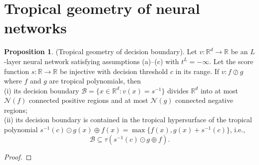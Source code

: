 \documentclass{article}
\theoremstyle{definition}
\newtheorem{proposition}[theorem]{Proposition}
\begin{document}
\newpage

\section{Tropical geometry of neural networks}
\label{sec:tropical_geometry_of_neural_networks}

\begin{proposition}\cite{zhang2018tropical}(Tropical geometry of decision boundary).
Let $v : \mathbb{R}^{d} \to \mathbb{R}$ be an $L$-layer neural network satisfying assumptions (a)–(c) with $t^{L}=-\infty$. Let the score function $s: \mathbb{R} \to \mathbb{R}$ be injective with decision threshold $c$ in its range. If $v : f \oslash g$ where $f$ and $g$ are tropical polynomials, then \\
(i) its decision boundary $\mathcal{B}=\{ x \in \mathbb{R}^{d} : v(x) = s^{-1}\}$ divides $\mathbb{R}^{d}$ into at most $\mathcal{N} (f)$ connected positive regions and at most $\mathcal{N}(g)$ connected negative regions; \\
(ii) its decision boundary is contained in the tropical hypersurface of the tropical polynomial $s^{-1}(c) \odot g(x) \oplus f(x) = \max\{f(x), g(x) + s^{-1}(c)\}$, i.e.,
$$\mathcal{B} \subseteq \tau(s^{-1}(c) \odot g \oplus f).$$
\end{proposition}
\begin{proof}

\end{proof}

\newpage

%
%
%
%
%
%
%
%
%
%
%


%

%
%



\end{document}
